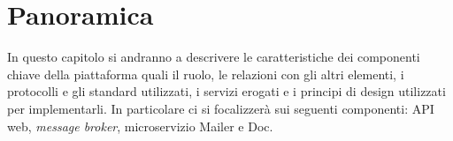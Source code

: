 \section{Panoramica}
In questo capitolo si andranno a descrivere le caratteristiche dei componenti chiave della piattaforma quali il ruolo, le relazioni con gli altri elementi,
i protocolli e gli standard utilizzati, i servizi erogati e i principi di design utilizzati per implementarli.
In particolare ci si focalizzerà sui seguenti componenti: API web, \textit{message broker}, microservizio Mailer e Doc.
